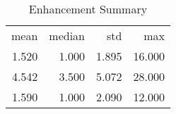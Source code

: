 \begin{table}[ht]
\centering
\caption{Enhancement Summary} 
\begin{tabular}{rrrr}
 mean & median & std & max \\ 
 1.520 & 1.000 & 1.895 & 16.000 \\ 
   \hline
4.542 & 3.500 & 5.072 & 28.000 \\ 
  1.590 & 1.000 & 2.090 & 12.000 \\ 
  \end{tabular}
\end{table}
